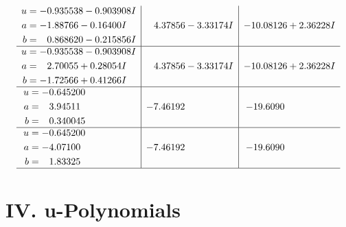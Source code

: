 \documentclass[1p]{elsarticle_modified}
\theoremstyle{definition}
\begin{document}
$$\begin{array}{c|c|c}
\begin{aligned}
u &= -0.935538 - 0.903908 I \\
a &= -1.88766 - 0.16400 I \\
b &= \phantom{-}0.868620 - 0.215856 I\end{aligned}
 & \phantom{-}4.37856 - 3.33174 I & -10.08126 + 2.36228 I \\ \hline\begin{aligned}
u &= -0.935538 - 0.903908 I \\
a &= \phantom{-}2.70055 + 0.28054 I \\
b &= -1.72566 + 0.41266 I\end{aligned}
 & \phantom{-}4.37856 - 3.33174 I & -10.08126 + 2.36228 I \\ \hline\begin{aligned}
u &= -0.645200\phantom{ +0.000000I} \\
a &= \phantom{-}3.94511\phantom{ +0.000000I} \\
b &= \phantom{-}0.340045\phantom{ +0.000000I}\end{aligned}
 & -7.46192\phantom{ +0.000000I} & -19.6090\phantom{ +0.000000I} \\ \hline\begin{aligned}
u &= -0.645200\phantom{ +0.000000I} \\
a &= -4.07100\phantom{ +0.000000I} \\
b &= \phantom{-}1.83325\phantom{ +0.000000I}\end{aligned}
 & -7.46192\phantom{ +0.000000I} & -19.6090\phantom{ +0.000000I}\\
 \hline 
 \end{array}$$\newpage
\newpage\renewcommand{\arraystretch}{1}
\centering \section*{ IV. u-Polynomials}
\end{document}
